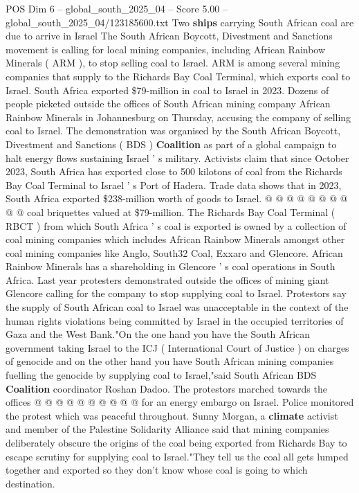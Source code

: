 \begin{textsample}{POS Dim 6 – global\_south\_2025\_04 – Score 5.00 – global\_south\_2025\_04/123185600.txt}  \label{ex:f6_pos_282}
Two \textbf{ships} carrying South African coal are due to arrive in Israel The South African Boycott, Divestment and Sanctions movement is calling for local mining companies, including African Rainbow Minerals ( ARM ), to stop selling coal to Israel.
ARM is among several mining companies that supply to the Richards Bay Coal Terminal, which exports coal to Israel.
South Africa exported \$79-million in coal to Israel in 2023.
Dozens of people picketed outside the offices of South African mining company African Rainbow Minerals in Johannesburg on Thursday, accusing the company of selling coal to Israel.
The demonstration was organised by the South African Boycott, Divestment and Sanctions ( BDS ) \textbf{Coalition} as part of a global campaign to halt energy flows sustaining Israel ' s military.
Activists claim that since October 2023, South Africa has exported close to 500 kilotons of coal from the Richards Bay Coal Terminal to Israel ' s Port of Hadera.
Trade data shows that in 2023, South Africa exported \$238-million worth of goods to Israel. @ @ @ @ @ @ @ @ @ @ coal briquettes valued at \$79-million.
The Richards Bay Coal Terminal ( RBCT ) from which South Africa ' s coal is exported is owned by a collection of coal mining companies which includes African Rainbow Minerals amongst other coal mining companies like Anglo, South32 Coal, Exxaro and Glencore.
African Rainbow Minerals has a shareholding in Glencore ' s coal operations in South Africa.
Last year protesters demonstrated outside the offices of mining giant Glencore calling for the company to stop supplying coal to Israel.
Protestors say the supply of South African coal to Israel was unacceptable in the context of the human rights violations being committed by Israel in the occupied territories of Gaza and the West Bank."On the one hand you have the South African government taking Israel to the ICJ ( International Court of Justice ) on charges of genocide and on the other hand you have South African mining companies fuelling the genocide by supplying coal to Israel,"said South African BDS \textbf{Coalition} coordinator Roshan Dadoo.
The protestors marched towards the offices @ @ @ @ @ @ @ @ @ @ for an energy embargo on Israel.
Police monitored the protest which was peaceful throughout.
Sunny Morgan, a \textbf{climate} activist and member of the Palestine Solidarity Alliance said that mining companies deliberately obscure the origins of the coal being exported from Richards Bay to escape scrutiny for supplying coal to Israel."They tell us the coal all gets lumped together and exported so they don't know whose coal is going to which destination.

\end{textsample}
